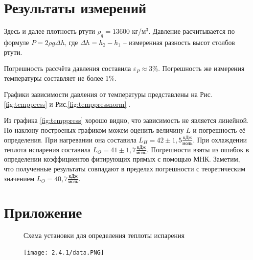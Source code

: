 \documentclass[a4paper,12pt]{article} %
\begin{document}
\section{Результаты измерений}

Здесь и далее плотность ртути $\rho_q = 13600$ кг/м$^3$. Давление расчитывается по формуле $P = 2\rho g\Delta h$, где $\Delta h = h_2 - h_1$ -- измеренная разность высот столбов ртути.
\break

     


Погрешность рассчёта давления составила $\varepsilon_P \approx 3\%$. Погрешность же измерения температуры составляет не более 1\%.

Графики зависимости давления от температуры представлены на Рис.\ref{fig:temppress} и Рис.\ref{fig:temppressnorm} .



Из графика \ref{fig:temppress} хорошо видно, что зависимость не является линейной. По наклону построеных графиком можем оценить величину $L$ и погрешность её определения. При нагревании она составила $\displaystyle L_H = 42 \pm 1,5 \frac{\mbox{кДж}}{\mbox{моль}}$. При охлаждении теплота испарения составила $\displaystyle L_O = 41 \pm 1,7 \frac{\mbox{кДж}}{\mbox{моль}}$. Погрешности взяты из ошибок в определении коэффициентов фитирующих прямых с помощью МНК. Заметим, что полученные результаты совпадают в пределах погрешности с теоретическим значением $\displaystyle L_O = 40,7 \frac{\mbox{кДж}}{\mbox{моль}}$.

\section{Приложение}

\begin{figure}

    \label{machine}
	\caption{Схема установки для определения теплоты испарения}
\end{figure}

\begin{figure}[h]
    \centering
    \texttt{[image: 2.4.1/data.PNG]}
    \label{data}
\end{figure}
\end{document}
